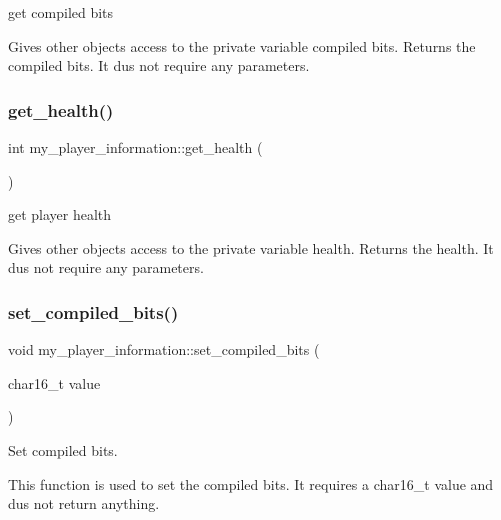 get compiled bits 

Gives other objects access to the private variable compiled bits. Returns the compiled bits. It dus not require any parameters. \hypertarget{classmy__player__information_a627d9bfc027e556998519c7ff9eff157}{}\label{classmy__player__information_a627d9bfc027e556998519c7ff9eff157} 
\subsubsection{\texorpdfstring{get\+\_\+health()}{get\_health()}}
{\footnotesize\ttfamily int my\+\_\+player\+\_\+information\+::get\+\_\+health (\begin{DoxyParamCaption}{ }\end{DoxyParamCaption})\hspace{0.3cm}{\ttfamily [inline]}}



get player health 

Gives other objects access to the private variable health. Returns the health. It dus not require any parameters. \hypertarget{classmy__player__information_a0cbbe520cb8591e71f1ac4164c9536d2}{}\label{classmy__player__information_a0cbbe520cb8591e71f1ac4164c9536d2} 
\subsubsection{\texorpdfstring{set\+\_\+compiled\+\_\+bits()}{set\_compiled\_bits()}}
{\footnotesize\ttfamily void my\+\_\+player\+\_\+information\+::set\+\_\+compiled\+\_\+bits (\begin{DoxyParamCaption}\item[{char16\+\_\+t}]{value }\end{DoxyParamCaption})\hspace{0.3cm}{\ttfamily [inline]}}



Set compiled bits. 

This function is used to set the compiled bits. It requires a char16\+\_\+t value and dus not return anything. \hypertarget{classmy__player__information_ae7c84c2a5a688d61f9452c78d6e8e82e}{}\label{classmy__player__information_ae7c84c2a5a688d61f9452c78d6e8e82e} 
